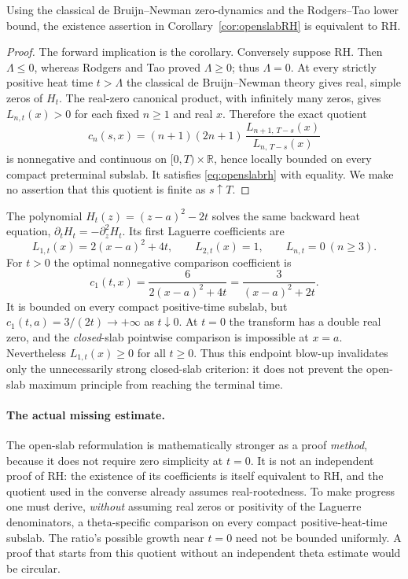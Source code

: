 \begin{proposition}\label{prop:openslabequivalence}
Using the classical de Bruijn--Newman zero-dynamics
and the Rodgers--Tao lower bound, the existence
assertion in Corollary~\ref{cor:openslabRH}
is equivalent to RH.
\end{proposition}
\begin{proof}
The forward implication is the corollary.
Conversely suppose RH. Then
$\Lambda\le0$, whereas Rodgers and Tao proved
$\Lambda\ge0$; thus $\Lambda=0$.
At every strictly positive heat time $t>\Lambda$
the classical de Bruijn--Newman theory gives
real, simple zeros of $H_t$.
The real-zero canonical product, with infinitely
many zeros, gives
$L_{n,t}(x)>0$ for each fixed $n\ge1$ and real $x$.
Therefore the exact quotient
\[
c_n(s,x)=
(n+1)(2n+1)\,
\frac{L_{n+1,\,T-s}(x)}{L_{n,\,T-s}(x)}
\]
is nonnegative and continuous on $[0,T)\times
\mathbb R$, hence locally bounded on every
compact preterminal subslab. It satisfies
\eqref{eq:openslabrh} with equality.
We make no assertion that this quotient
is finite as $s\uparrow T$.
\end{proof}

\begin{example}\label{ex:heatcollision}
The polynomial $H_t(z)=(z-a)^2-2t$ solves the
same backward heat equation,
$\partial_tH_t=-\partial_z^2H_t$.
Its first Laguerre coefficients are
\[
L_{1,t}(x)=2(x-a)^2+4t,\qquad
L_{2,t}(x)=1,\qquad L_{n,t}=0\ (n\ge3).
\]
For $t>0$ the optimal nonnegative
comparison coefficient is
\begin{equation}\label{eq:collisioncost}
c_1(t,x)=
\frac6{2(x-a)^2+4t}
=\frac3{(x-a)^2+2t}.
\end{equation}
It is bounded on every compact positive-time
subslab, but
$c_1(t,a)=3/(2t)\to+\infty$ as $t\downarrow0$.
At $t=0$ the transform has a double real zero,
and the \emph{closed}-slab pointwise comparison
is impossible at $x=a$.
Nevertheless
$L_{1,t}(x)\ge0$ for all $t\ge0$.
Thus this endpoint blow-up invalidates only
the unnecessarily strong closed-slab criterion:
it does not prevent the open-slab maximum
principle from reaching the terminal time.
\end{example}

\paragraph{The actual missing estimate.}
The open-slab reformulation is mathematically
stronger as a proof \emph{method}, because it
does not require zero simplicity at $t=0$.
It is not an independent proof of RH:
the existence of its coefficients is itself
equivalent to RH, and the quotient used in
the converse already assumes real-rootedness.
To make progress one must derive, \emph{without}
assuming real zeros or positivity of the
Laguerre denominators, a theta-specific
comparison on every compact positive-heat-time
subslab. The ratio's possible growth near
$t=0$ need not be bounded uniformly.
A proof that starts from this quotient
without an independent theta estimate
would be circular.
